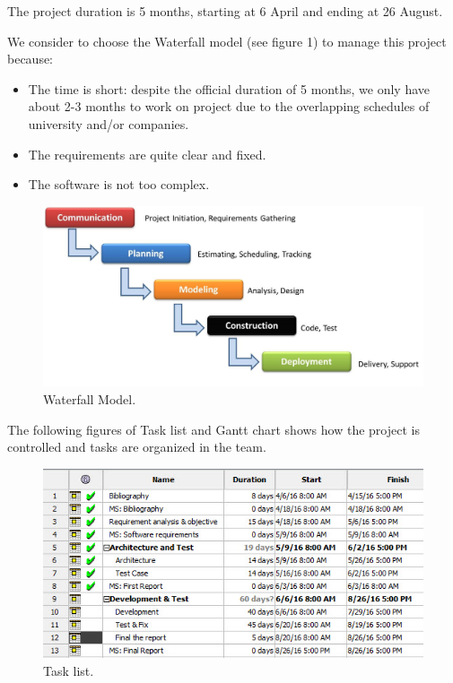 \documentclass[11pt]{article}
\begin{document}
\par\noindent The project duration is 5 months, starting at 6 April and ending at 26 August.
\par\noindent We consider to choose the Waterfall model (see figure 1) to manage this project because: 
\begin{itemize}
\item The time is short: despite the official duration of 5 months, we only have about 2-3 months to work on project due to the overlapping schedules of university and/or companies.
\item The requirements are quite clear and fixed.
\item The software is not too complex.
\end{itemize}
\begin{figure}[H] 
  \includegraphics[width=\linewidth]{P3.jpg}
  \caption{Waterfall Model.}
  \label{fig:wmodel}
\end{figure}
\par\noindent The following figures of Task list and Gantt chart shows how the project is controlled and tasks are organized in the team.
\begin{figure}[H] 
  \includegraphics[width=\linewidth]{P1.jpg}
  \caption{Task list.}
  \label{fig:gantt1}
\end{figure}
\end{document}
